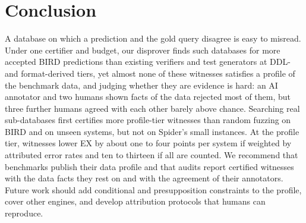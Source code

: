 \section{Conclusion}\label{sec:conclusion}
A database on which a prediction and the gold query disagree is easy to misread. Under one certifier and budget, our disprover finds such databases for more accepted BIRD predictions than existing verifiers and test generators at DDL- and format-derived tiers, yet almost none of these witnesses satisfies a profile of the benchmark data, and judging whether they are evidence is hard: an AI annotator and two humans shown facts of the data rejected most of them, but three further humans agreed with each other barely above chance. Searching real sub-databases first certifies more profile-tier witnesses than random fuzzing on BIRD and on unseen systems, but not on Spider's small instances. At the profile tier, witnesses lower EX by about one to four points per system if weighted by attributed error rates and ten to thirteen if all are counted. We recommend that benchmarks publish their data profile and that audits report certified witnesses with the data facts they rest on and with the agreement of their annotators. Future work should add conditional and presupposition constraints to the profile, cover other engines, and develop attribution protocols that humans can reproduce.
\label{endconclusion}

